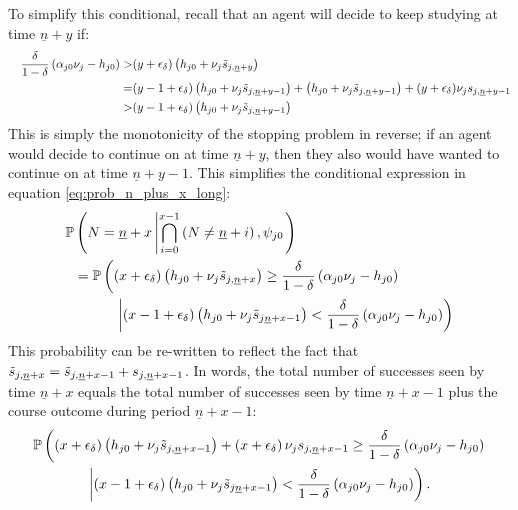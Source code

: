 To simplify this conditional, recall that an agent will decide to keep studying at time $\underline{n} + y$ if:
\begin{alignat*}{3}
&&
\frac{\delta}{1 - \delta}
\pr{\alpha_{j0} \nu_j - h_{j0}}
>&
(y + \epsilon_\delta)
\pr{h_{j0} + \nu_j \ks[, \underline{n} + y]}
\\
&&
=&
(y - 1 + \epsilon_\delta)
\pr{h_{j0} + \nu_j \ks[, \underline{n} + y -1]}
+ 
\pr{h_{j0} + \nu_j \ks[, \underline{n} + y -1]}
+
(y + \epsilon_\delta)
\nu_j \pass_{j, \underline{n} + y - 1}
\\
&&
>&
(y - 1 + \epsilon_\delta)
\pr{h_{j0} + \nu_j \ks[, \underline{n} + y -1]}
\end{alignat*}
This is simply the monotonicity of the stopping problem in reverse; if an agent would decide to continue on at time $\underline{n} + y$, then they also would have wanted to continue on at time $\underline{n} + y - 1$.
This simplifies the conditional expression in equation \eqref{eq:prob_n_plus_x_long}:
\begin{align}
    \nonumber
    \PP  &\pr{\crs{
        N = \underline{n} + x
    }{
    \bigcap_{i=0}^{x-1}
        \pr{N \neq \underline{n} + i}
    , \psi_{j0}}}
    \\ 
    \nonumber
    &=
    \PP \left( 
        (x + \epsilon_\delta)
        \pr{h_{j0} + \nu_j \ks[, \underline{n} +x]
        }
        \geq
        \frac{\delta}{1 - \delta}
        \pr{\alpha_{j0} \nu_j - h_{j0}}
    \right.
    \\ \nonumber
    &\quad\quad\quad\left\vert
        (x - 1 + \epsilon_\delta)
        \pr{h_{j0} 
        + \nu_j \ks[\underline{n} + x - 1]
        }
        <
        \frac{\delta}{1 - \delta}
        \pr{\alpha_{j0} \nu_j - h_{j0}}
    \right)
\end{align}
This probability can be re-written to reflect the fact that $\ks[,\underline{n} + x] = \ks[,\underline{n} + x -1] + \pass_{j, \underline{n} + x - 1}$.
In words, the total number of successes seen by time $\underline{n} + x$ equals the total number of successes seen by time $\underline{n} + x - 1$ plus the course outcome during period $\underline{n} + x - 1$:
\begin{multline*}
    \PP \left( 
        \pr{x + \epsilon_\delta}
        \pr{h_{j0} 
        + \nu_j \ks[, \underline{n} + x - 1]}
        +
        \pr{x + \epsilon_\delta}
        \nu_j \pass_{j, \underline{n} + x - 1}
        \geq
        \frac{\delta}{1 - \delta}
        \pr{\alpha_{j0} \nu_j - h_{j0}}
    \right.
    \\
    \left\vert
        (x - 1 + \epsilon_\delta)
        \pr{h_{j0} 
        + \nu_j \ks[\underline{n} + x - 1]
        }
        <
        \frac{\delta}{1 - \delta}
        \pr{\alpha_{j0} \nu_j - h_{j0}}
    \right).
\end{multline*}
